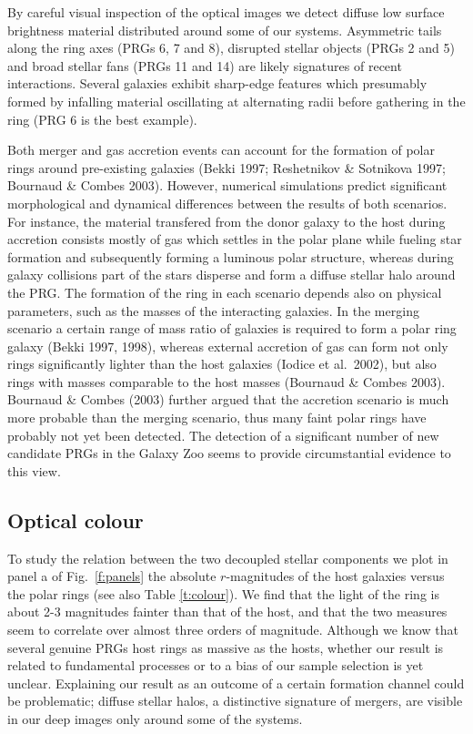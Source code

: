 \documentclass[useAMS,usenatbib]{mn2e}
\begin{document}
By careful visual inspection of the optical images we detect diffuse low surface brightness material distributed around some of our systems. 
Asymmetric tails along the ring axes (PRGs 6, 7 and 8), disrupted stellar objects (PRGs 2 and 5) and broad stellar fans (PRGs 11 and 14) are likely signatures of recent interactions. Several galaxies exhibit sharp-edge features which presumably formed by infalling material oscillating at alternating radii before gathering in the ring (PRG 6 is the best example).

Both merger and gas accretion events can account for the formation of polar rings around pre-existing galaxies (Bekki 1997; Reshetnikov \& Sotnikova 1997; Bournaud \& Combes 2003). 
However, numerical simulations predict significant morphological and dynamical differences between the results of both scenarios. 
For instance, the material transfered from the donor galaxy to the host during accretion consists mostly of gas which settles in the polar plane while fueling star formation and subsequently forming a luminous polar structure, whereas during galaxy collisions part of the stars disperse and form a diffuse stellar halo around the PRG.
The formation of the ring in each scenario depends also on physical parameters, such as the masses of the interacting galaxies. In the merging scenario a certain range of mass ratio of galaxies is required to form a polar ring galaxy (Bekki 1997, 1998), whereas external accretion of gas can form not only rings significantly lighter than the host galaxies (Iodice et al.\ 2002), but also rings with masses comparable to the host masses (Bournaud \& Combes 2003).
Bournaud \& Combes (2003) further argued that the accretion scenario is much more probable than the merging scenario, thus many faint polar rings have probably not yet been detected. The detection of a significant number of new candidate PRGs in the Galaxy Zoo seems to provide circumstantial evidence to this view.  

\subsection{Optical colour}
To study the relation between the two decoupled stellar components we plot in panel a of Fig.\ \ref{f:panels} the absolute $r$-magnitudes of the host galaxies versus the polar rings (see also Table \ref{t:colour}).
We find that the light of the ring is about 2-3 magnitudes fainter than that of the host, and that the two measures seem to correlate over almost three orders of magnitude.
Although we know that several genuine PRGs host rings as massive as the hosts, whether our result is related to fundamental processes or to a bias of our sample selection is yet unclear. Explaining our result as an outcome of a certain formation channel could be problematic; diffuse stellar halos, a distinctive signature of mergers, are visible in our deep images only around some of the systems.
\end{document}
